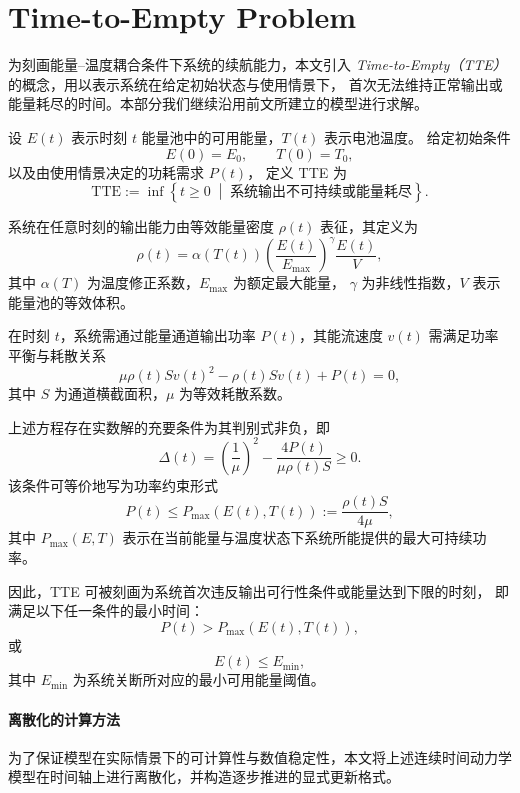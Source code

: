 \documentclass[11pt]{article}
\begin{document}
\section{Time-to-Empty Problem}

为刻画能量–温度耦合条件下系统的续航能力，本文引入
\emph{Time-to-Empty（TTE）} 的概念，用以表示系统在给定初始状态与使用情景下，
首次无法维持正常输出或能量耗尽的时间。本部分我们继续沿用前文所建立的模型进行求解。

设 $E(t)$ 表示时刻 $t$ 能量池中的可用能量，$T(t)$ 表示电池温度。
给定初始条件
\[
E(0)=E_0, \qquad T(0)=T_0,
\]
以及由使用情景决定的功耗需求 $P(t)$，
定义 TTE 为
\[
\mathrm{TTE}
:= \inf \left\{ t \ge 0 \;\middle|\;
\text{系统输出不可持续或能量耗尽} \right\}.
\]

系统在任意时刻的输出能力由等效能量密度 $\rho(t)$ 表征，其定义为
\[
\rho(t)
=
\alpha\!\left(T(t)\right)
\left( \frac{E(t)}{E_{\max}} \right)^{\gamma}
\frac{E(t)}{V},
\]
其中 $\alpha(T)$ 为温度修正系数，$E_{\max}$ 为额定最大能量，
$\gamma$ 为非线性指数，$V$ 表示能量池的等效体积。

在时刻 $t$，系统需通过能量通道输出功率 $P(t)$，其能流速度 $v(t)$
需满足功率平衡与耗散关系
\[
\mu \rho(t) S v(t)^2
-
\rho(t) S v(t)
+
P(t)
=0,
\]
其中 $S$ 为通道横截面积，$\mu$ 为等效耗散系数。

上述方程存在实数解的充要条件为其判别式非负，即
\[
\Delta(t)
=
\left( \frac{1}{\mu} \right)^2
-
\frac{4 P(t)}{\mu \rho(t) S}
\ge 0.
\]
该条件可等价地写为功率约束形式
\[
P(t) \le P_{\max}(E(t),T(t))
:= \frac{\rho(t) S}{4\mu},
\]
其中 $P_{\max}(E,T)$ 表示在当前能量与温度状态下系统所能提供的最大可持续功率。

因此，TTE 可被刻画为系统首次违反输出可行性条件或能量达到下限的时刻，
即满足以下任一条件的最小时间：
\begin{equation}
P(t) > P_{\max}(E(t),T(t)),
\end{equation}
或
\begin{equation}
E(t) \le E_{\min},
\end{equation}
其中 $E_{\min}$ 为系统关断所对应的最小可用能量阈值。

\vspace{0.5em}

\paragraph{离散化的计算方法}
为了保证模型在实际情景下的可计算性与数值稳定性，本文将上述连续时间动力学模型在时间轴上进行离散化，并构造逐步推进的显式更新格式。
\end{document}
